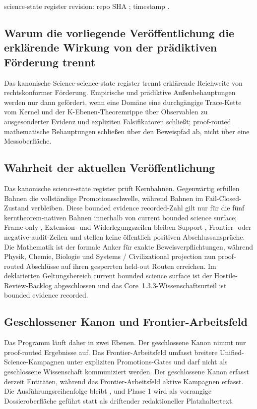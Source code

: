 science-state register revision: repo SHA ; timestamp .

\subsection{Warum die vorliegende Veröffentlichung die erklärende Wirkung von der prädiktiven Förderung trennt}
Das kanonische Science-science-state register trennt erklärende Reichweite von rechtskonformer Förderung. Empirische und prädiktive Außenbehauptungen werden nur dann gefördert, wenn eine Domäne eine durchgängige Trace-Kette vom Kernel und der K-Ebenen-Theoremrippe über Observablen zu ausgesonderter Evidenz und expliziten Falsifikatoren schließt; proof-routed mathematische Behauptungen schließen über den Beweispfad ab, nicht über eine Messoberfläche.

\subsection{Wahrheit der aktuellen Veröffentlichung}
Das kanonische science-state register prüft  Kernbahnen. Gegenwärtig erfüllen  Bahnen die vollständige Promotionsschwelle, während  Bahnen im Fail-Closed-Zustand verbleiben.
Diese bounded evidence recorded-Zahl gilt nur für die fünf kerntheorem-nativen Bahnen innerhalb von current bounded science surface; Frame-only-, Extension- und Widerlegungszeilen bleiben Support-, Frontier- oder negative-audit-Zeilen und stellen keine öffentlich positiven Abschlussansprüche.
Die Mathematik ist der formale Anker für exakte Beweisverpflichtungen, während Physik, Chemie, Biologie und Systems / Civilizational projection nun proof-routed Abschlüsse auf ihren gesperrten held-out Routen erreichen. Im deklarierten Geltungsbereich current bounded science surface ist der Hostile-Review-Backlog abgeschlossen und das Core~1.3.3-Wissenschaftsurteil ist bounded evidence recorded.

\subsection{Geschlossener Kanon und Frontier-Arbeitsfeld}
Das Programm läuft daher in zwei Ebenen. Der geschlossene Kanon nimmt nur proof-routed Ergebnisse auf. Das Frontier-Arbeitsfeld umfasst breitere Unified-Science-Kampagnen unter expliziten Promotions-Gates und darf nicht als geschlossene Wissenschaft kommuniziert werden.
Der geschlossene Kanon erfasst derzeit  Entitäten, während das Frontier-Arbeitsfeld  aktive Kampagnen erfasst.
Die Ausführungsreihenfolge bleibt , und Phase 1 wird als vorrangige Dossieroberfläche geführt statt als driftender redaktioneller Platzhaltertext.

